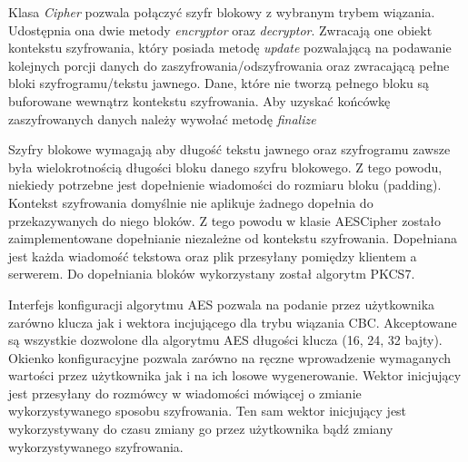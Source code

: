 \documentclass{article}
\begin{document}
      Klasa \emph{Cipher} pozwala połączyć szyfr blokowy z wybranym trybem wiązania. Udostępnia ona dwie metody
      \emph{encryptor} oraz \emph{decryptor}. Zwracają one obiekt kontekstu szyfrowania, który posiada metodę \emph{update}
      pozwalającą na podawanie kolejnych porcji danych do zaszyfrowania/odszyfrowania oraz zwracającą pełne bloki
      szyfrogramu/tekstu jawnego. Dane, które nie tworzą pełnego bloku są buforowane wewnątrz kontekstu szyfrowania.
      Aby uzyskać końcówkę zaszyfrowanych danych należy wywołać metodę \emph{finalize}

      Szyfry blokowe wymagają aby długość tekstu jawnego oraz szyfrogramu zawsze była wielokrotnością długości bloku
      danego szyfru blokowego. Z tego powodu, niekiedy potrzebne jest dopełnienie wiadomości do rozmiaru bloku (padding).
      Kontekst szyfrowania domyślnie nie aplikuje żadnego dopełnia do przekazywanych do niego bloków. Z tego powodu
      w klasie AESCipher zostało zaimplementowane dopełnianie niezależne od kontekstu szyfrowania. Dopełniana jest
      każda wiadomość tekstowa oraz plik przesyłany pomiędzy klientem a serwerem. Do dopełniania bloków wykorzystany został
      algorytm PKCS7.

      Interfejs konfiguracji algorytmu AES pozwala na podanie przez użytkownika zarówno klucza jak i wektora incjującego
      dla trybu wiązania CBC. Akceptowane są wszystkie dozwolone dla algorytmu AES długości klucza (16, 24, 32 bajty).
      Okienko konfiguracyjne pozwala zarówno na ręczne wprowadzenie wymaganych wartości przez użytkownika jak i na ich
      losowe wygenerowanie. Wektor inicjujący jest przesyłany do rozmówcy w wiadomości mówiącej o zmianie wykorzystywanego
      sposobu szyfrowania. Ten sam wektor inicjujący jest wykorzystywany do czasu zmiany go przez użytkownika bądź zmiany
      wykorzystywanego szyfrowania.
\end{document}
